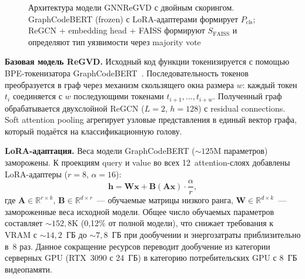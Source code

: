 \documentclass[runningheads]{llncs}
\begin{document}
\begin{figure}
{%
}
\caption{Архитектура модели GNNReGVD с двойным скорингом. GraphCodeBERT (frozen) с LoRA-адаптерами формирует $P_{\text{cls}}$; ReGCN + embedding head + FAISS формируют $S_{\text{FAISS}}$ и определяют тип уязвимости через majority vote}
\label{fig:model}
\end{figure}

\textbf{Базовая модель ReGVD.} Исходный код функции токенизируется с помощью BPE-токенизатора GraphCodeBERT~\cite{guo2021graphcodebert}. Последовательность токенов преобразуется в граф через механизм скользящего окна размера $w$: каждый токен $t_i$ соединяется с $w$ последующими токенами $t_{i+1}, \ldots, t_{i+w}$. Полученный граф обрабатывается двухслойной ReGCN ($L{=}2$, $h{=}128$) с residual connections. Soft attention pooling агрегирует узловые представления в единый вектор графа, который подаётся на классификационную голову.

\textbf{LoRA-адаптация.} Веса модели GraphCodeBERT (${\sim}125$M параметров) заморожены. К проекциям query и value во всех 12~attention-слоях добавлены LoRA-адаптеры ($r = 8$, $\alpha = 16$):
\begin{equation}
    \mathbf{h} = \mathbf{W}\mathbf{x} + \mathbf{B}(\mathbf{A}\mathbf{x}) \cdot \frac{\alpha}{r},
    \label{eq:lora}
\end{equation}
где $\mathbf{A} \in \mathbb{R}^{r \times k}$, $\mathbf{B} \in \mathbb{R}^{d \times r}$~--- обучаемые матрицы низкого ранга, $\mathbf{W} \in \mathbb{R}^{d \times k}$~--- замороженные веса исходной модели. Общее число обучаемых параметров составляет ${\sim}152{,}8$K (0,12\% от полной модели), что снижает требования к VRAM с ${\sim}14{,}2$~ГБ до ${\sim}7{,}8$~ГБ при дообучении и энергозатраты приблизительно в~8 раз. Данное сокращение ресурсов переводит дообучение из категории серверных GPU (RTX~3090 с 24~ГБ) в категорию потребительских GPU с 8~ГБ видеопамяти.
\end{document}
